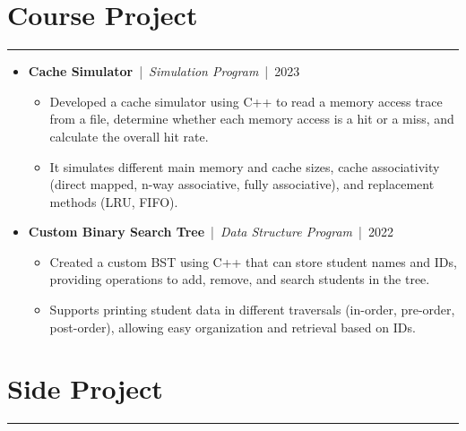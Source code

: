 \documentclass[11pt]{article}
\begin{document}
\section*{Course Project}
\vspace{-1.0em}
\hrule
\vspace{0.5em}

\begin{itemize}[leftmargin=0pt, label={}, itemsep=0pt,
  topsep=0pt,
  parsep=0pt,
  partopsep=0pt]  %
  \item 
    \textbf{Cache Simulator} \,|\, \textit{Simulation Program} \,|\, 2023
    \begin{itemize}[label=\textbullet, leftmargin=1.5em, itemsep=0pt, topsep=0pt, parsep=0pt, partopsep=0pt]
      \item Developed a cache simulator using C++ to read a memory access trace from a file, 
            determine whether each memory access is a hit or a miss, and calculate the overall hit rate.
      \item It simulates different main memory and cache sizes, cache associativity
            (direct mapped, n-way associative, fully associative), and replacement methods (LRU, FIFO).
    \end{itemize}

  

  \item
    \textbf{Custom Binary Search Tree} \,|\, \textit{Data Structure Program} \,|\, 2022
    \begin{itemize}[label=\textbullet, leftmargin=1.5em, itemsep=0pt, topsep=0pt, parsep=0pt, partopsep=0pt]
      \item Created a custom BST using C++ that can store student names and IDs, providing 
            operations to add, remove, and search students in the tree.
      \item Supports printing student data in different traversals (in-order, pre-order, post-order),
            allowing easy organization and retrieval based on IDs.
    \end{itemize}

  

 

\end{itemize}

\section*{Side Project}
\vspace{-1.0em}
\hrule
\vspace{0.5em}
\end{document}
